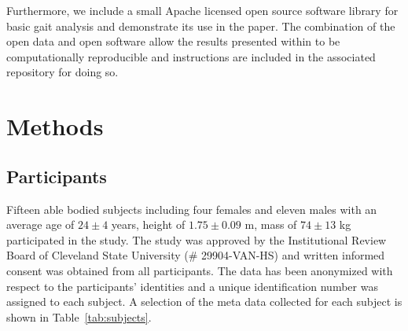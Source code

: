 \documentclass[fleqn,12pt]{wlpeerj}
\begin{document}
Furthermore, we include a small Apache licensed open source software library
for basic gait analysis and demonstrate its use in the paper. The combination
of the open data and open software allow the results presented within to be
computationally reproducible and instructions are included in the associated
repository for doing so.

\section*{Methods}
\subsection*{Participants}
%
Fifteen able bodied subjects including four females and eleven males with an
average age of $24\pm4$ years, height of $1.75\pm0.09$ m, mass of $74\pm13$ kg
participated in the study. The study was approved by the Institutional Review
Board of Cleveland State University (\# 29904-VAN-HS) and written informed
consent was obtained from all participants. The data has been anonymized with
respect to the participants' identities and a unique identification number was
assigned to each subject. A selection of the meta data collected for each
subject is shown in Table~\ref{tab:subjects}.
%
\begin{table}
  \cprotect\caption{Information about the 15 study participants. The final
    three columns provide the trial numbers associated with each nominal
    treadmill speed. The measured mass is computed from the mean total vertical
    ground reaction force just after the calibration pose event, if possible.
    If the mass is reported without an accompanying standard deviation, it is
    the subject's self-reported mass. Additional trials found in the data set
    with a subject identification number 0 are trials with no subject, i.e.
    unloaded trials that can be used for inertial compensation purposes, and
    are not shown in the table. Generated by \verb|src/subject_table.py|.}
  \centering
  \small
  
  \label{tab:subjects}
\end{table}
\end{document}

